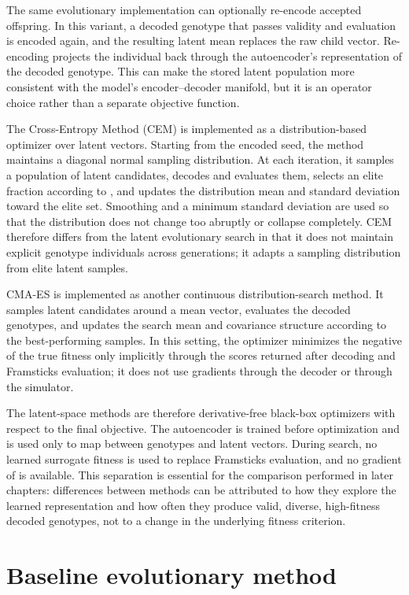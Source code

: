 The same evolutionary implementation can optionally re-encode accepted offspring. In this variant, a decoded genotype that passes validity and evaluation is encoded again, and the resulting latent mean replaces the raw child vector. Re-encoding projects the individual back through the autoencoder's representation of the decoded genotype. This can make the stored latent population more consistent with the model's encoder--decoder manifold, but it is an operator choice rather than a separate objective function.

The Cross-Entropy Method (CEM) is implemented as a distribution-based optimizer over latent vectors. Starting from the encoded seed, the method maintains a diagonal normal sampling distribution. At each iteration, it samples a population of latent candidates, decodes and evaluates them, selects an elite fraction according to \vertpos{}, and updates the distribution mean and standard deviation toward the elite set. Smoothing and a minimum standard deviation are used so that the distribution does not change too abruptly or collapse completely. CEM therefore differs from the latent evolutionary search in that it does not maintain explicit genotype individuals across generations; it adapts a sampling distribution from elite latent samples.

CMA-ES is implemented as another continuous distribution-search method. It samples latent candidates around a mean vector, evaluates the decoded genotypes, and updates the search mean and covariance structure according to the best-performing samples. In this setting, the optimizer minimizes the negative of the true fitness only implicitly through the scores returned after decoding and Framsticks evaluation; it does not use gradients through the decoder or through the simulator.

The latent-space methods are therefore derivative-free black-box optimizers with respect to the final objective. The autoencoder is trained before optimization and is used only to map between \fone{} genotypes and latent vectors. During search, no learned surrogate fitness is used to replace Framsticks evaluation, and no gradient of \vertpos{} is available. This separation is essential for the comparison performed in later chapters: differences between methods can be attributed to how they explore the learned representation and how often they produce valid, diverse, high-fitness decoded genotypes, not to a change in the underlying fitness criterion.

\section{Baseline evolutionary method}

